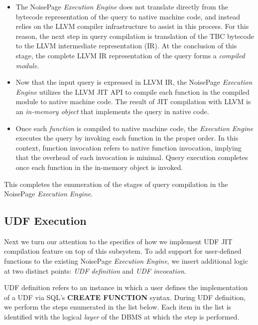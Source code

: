 \documentclass{vldb}
\newcommand{\dbCode}[1]{{\sffamily\small \textbf{#1}}\xspace}
\begin{document}
\begin{itemize}
    \item The NoisePage \textit{Execution Engine} does not translate directly from the bytecode representation of the query to native machine code, and instead relies on the LLVM compiler infrastructure to assist in this process. For this reason, the next step in query compilation is translation of the TBC bytecode to the LLVM intermediate representation (IR). At the conclusion of this stage, the complete LLVM IR representation of the query forms a \textit{compiled module}.
    \item Now that the input query is expressed in LLVM IR, the NoisePage \textit{Execution Engine} utilizes the LLVM JIT API to compile each function in the compiled module to native machine code. The result of JIT compilation with LLVM is an \textit{in-memory object} that implements the query in native code.
    \item Once each \textit{function} is compiled to native machine code, the \textit{Execution Engine} executes the query by invoking each function in the proper order. In this context, function invocation refers to native function invocation, implying that the overhead of each invocation is minimal. Query execution completes once each function in the in-memory object is invoked.
\end{itemize}

This completes the enumeration of the stages of query compilation in the NoisePage \textit{Execution Engine}. 

\subsection{UDF Execution}

Next we turn our attention to the specifics of how we implement UDF JIT compilation feature on top of this subsystem. To add support for user-defined functions to the existing NoisePage \textit{Execution Engine}, we insert additional logic at two distinct points: \textit{UDF definition} and \textit{UDF invocation}.

UDF definition refers to an instance in which a user defines the implementation of a UDF via SQL's \dbCode{CREATE FUNCTION} syntax. During UDF definition, we perform the steps enumerated in the list below. Each item in the list is identified with the logical \textit{layer} of the DBMS at which the step is performed.
\end{document}

